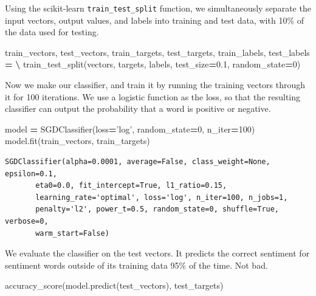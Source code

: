 \documentclass[]{book}
\newenvironment{Shaded}{\begin{snugshade}}{\end{snugshade}}
\newcommand{\DecValTok}[1]{\textcolor[rgb]{0.00,0.00,0.81}{#1}}
\newcommand{\FloatTok}[1]{\textcolor[rgb]{0.00,0.00,0.81}{#1}}
\newcommand{\StringTok}[1]{\textcolor[rgb]{0.31,0.60,0.02}{#1}}
\newcommand{\OperatorTok}[1]{\textcolor[rgb]{0.81,0.36,0.00}{\textbf{#1}}}
\newcommand{\NormalTok}[1]{#1}
\theoremstyle{definition}
\theoremstyle{definition}
\theoremstyle{definition}
\theoremstyle{remark}
\begin{document}
Using the scikit-learn \texttt{train\_test\_split} function, we
simultaneously separate the input vectors, output values, and labels
into training and test data, with 10\% of the data used for testing.

\begin{Shaded}
\begin{Highlighting}[]
\NormalTok{train_vectors, test_vectors, train_targets, test_targets, train_labels, test_labels }\OperatorTok{=} \OperatorTok{\textbackslash{}}
\NormalTok{    train_test_split(vectors, targets, labels, test_size}\OperatorTok{=}\FloatTok{0.1}\NormalTok{, random_state}\OperatorTok{=}\DecValTok{0}\NormalTok{)}
\end{Highlighting}
\end{Shaded}

Now we make our classifier, and train it by running the training vectors
through it for 100 iterations. We use a logistic function as the loss,
so that the resulting classifier can output the probability that a word
is positive or negative.

\begin{Shaded}
\begin{Highlighting}[]
\NormalTok{model }\OperatorTok{=}\NormalTok{ SGDClassifier(loss}\OperatorTok{=}\StringTok{'log'}\NormalTok{, random_state}\OperatorTok{=}\DecValTok{0}\NormalTok{, n_iter}\OperatorTok{=}\DecValTok{100}\NormalTok{)}
\NormalTok{model.fit(train_vectors, train_targets)}
\end{Highlighting}
\end{Shaded}

\begin{verbatim}
SGDClassifier(alpha=0.0001, average=False, class_weight=None, epsilon=0.1,
       eta0=0.0, fit_intercept=True, l1_ratio=0.15,
       learning_rate='optimal', loss='log', n_iter=100, n_jobs=1,
       penalty='l2', power_t=0.5, random_state=0, shuffle=True, verbose=0,
       warm_start=False)
\end{verbatim}

We evaluate the classifier on the test vectors. It predicts the correct
sentiment for sentiment words outside of its training data 95\% of the
time. Not bad.

\begin{Shaded}
\begin{Highlighting}[]
\NormalTok{accuracy_score(model.predict(test_vectors), test_targets)}
\end{Highlighting}
\end{Shaded}
\end{document}

